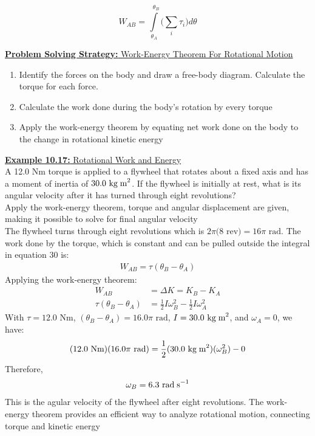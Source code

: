 \documentclass[a4paper]{article}
\let\bf\textbf
\newcommand\rads{\text{ rad\;s}^{-1}}
\newcommand\rad{\text{ rad}}
\newcommand\Nm{\text{ Nm}}
\newcommand\kgmm{\text{ kg\;m}^{2}}
\begin{document}
\begin{equation}
    W_{AB} = \int\limits_{\theta_A}^{\text{ }\theta_B}\bigg(\sum_{i}\tau_i\bigg)d\theta
\end{equation}
\begin{shaded}
    \underline{\bf{Problem Solving Strategy:} Work-Energy Theorem For Rotational Motion}
    \begin{enumerate}
        \item Identify the forces on the body and draw a free-body diagram. Calculate the torque for each force.
        \item Calculate the work done during the body's rotation by every torque
        \item Apply the work-energy theorem by equating net work done on the body to the change in rotational kinetic energy
    \end{enumerate}
\end{shaded}

\newpage
\begin{shaded}
    \underline{\bf{Example 10.17:} Rotational Work and Energy}
    \vspace{2mm}\\
    A 12.0 Nm torque is applied to a flywheel that rotates about a fixed axis and has a moment of inertia of $30.0\kgmm$. If the flywheel is initially at rest, what is its angular velocity after it has turned through eight revolutions?
    \vspace{1mm}\\
    Apply the work-energy theorem, torque and angular displacement are given, making it possible to solve for final angular velocity
    \vspace{1mm}\\
    The flywheel turns through eight revolutions which is $2\pi(8$ rev$) = 16\pi\rad$. The work done by the torque, which is constant and can be pulled outside the integral in equation 30 is:
    \begin{align*}
        W_{AB} = \tau(\theta_B - \theta_A)
    \end{align*}
    Applying the work-energy theorem:
    \begin{align*}
        W_{AB} &= \Delta K = K_B - K_A\\
        \tau(\theta_B - \theta_A) &= \frac{1}{2}I\omega_B^2 - \frac{1}{2}I\omega_A^2
    \end{align*}
    With $\tau = 12.0\Nm$, $(\theta_B - \theta_A) = 16.0\pi\rad$, $I = 30.0\kgmm$, and $\omega_A = 0$, we have:
    \begin{align*}
        (12.0\Nm)(16.0\pi\rad) = \frac{1}{2}(30.0\kgmm)(\omega_B^2) - 0
    \end{align*}
    Therefore,
    \begin{align*}
        \omega_B = 6.3\rads
    \end{align*}
    This is the agular velocity of the flywheel after eight revolutions. The work-energy theorem provides an efficient way to analyze rotational motion, connecting torque and kinetic energy
\end{shaded}
\end{document}

